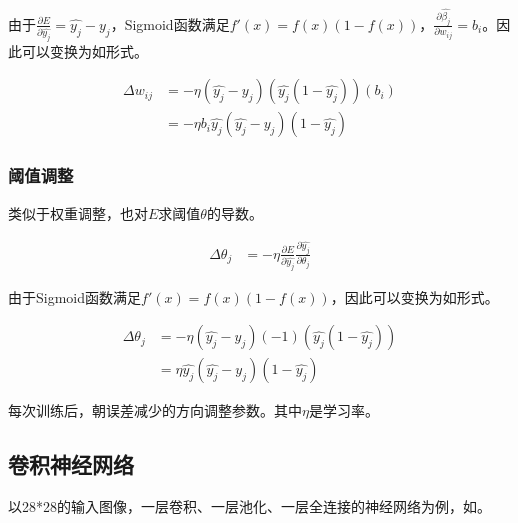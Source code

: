 由于$\frac{\partial E}{\partial \hat{y_j}} = \hat{y_j} - y_j$，Sigmoid函数满足$f\prime(x)=f(x)(1-f(x))$，$\frac{\partial \hat{\beta_j}}{\partial w_{ij}}=b_i$。因此可以变换为如形式。

\begin{equation}\label{eq:update-w-convert}
\begin{aligned}
\Delta w_{ij} &= -\eta (\hat{y_j} - y_j) (\hat{y_j}(1-\hat{y_j})) (b_i) \\
&= -\eta b_i \hat{y_j} (\hat{y_j} - y_j) (1 - \hat{y_j})
\end{aligned}
\end{equation}

\subsubsection{阈值调整}

类似于权重调整，也对$E$求阈值$\theta$的导数。

\begin{equation}\label{eq:update-theta}
\begin{aligned}
\Delta \theta_{j} &= -\eta \frac{\partial E}{\partial \hat{y_j}} \frac{\partial \hat{y_j}}{\partial \theta_j}
\end{aligned}
\end{equation}

由于Sigmoid函数满足$f\prime(x)=f(x)(1-f(x))$，因此可以变换为如形式。

\begin{equation}\label{eq:update-theta-convert}
\begin{aligned}
\Delta \theta_{j} &= -\eta (\hat{y_j} - y_j) (-1)(\hat{y_j}(1-\hat{y_j}))\\
&= \eta \hat{y_j} (\hat{y_j} - y_j) (1-\hat{y_j})
\end{aligned}
\end{equation}

每次训练后，朝误差减少的方向调整参数。其中$\eta$是学习率。

\subsection{卷积神经网络}

以28*28的输入图像，一层卷积、一层池化、一层全连接的神经网络为例，如。


